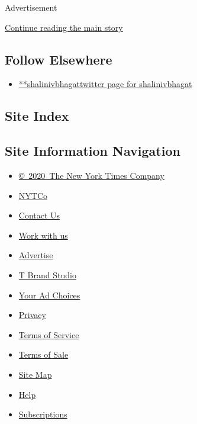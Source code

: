 Advertisement

\protect\hyperlink{after-mid2}{Continue reading the main story}

\hypertarget{follow-elsewhere}{%
\subsection{Follow Elsewhere}\label{follow-elsewhere}}

\begin{itemize}
\tightlist
\item
  \href{https://twitter.com/shalinivbhagat}{**shalinivbhagattwitter page
  for shalinivbhagat}
\end{itemize}

\hypertarget{site-index}{%
\subsection{Site Index}\label{site-index}}

\hypertarget{site-information-navigation}{%
\subsection{Site Information
Navigation}\label{site-information-navigation}}

\begin{itemize}
\tightlist
\item
  \href{https://help.nytimes.com/hc/en-us/articles/115014792127-Copyright-notice}{©~2020~The
  New York Times Company}
\end{itemize}

\begin{itemize}
\tightlist
\item
  \href{https://www.nytco.com/}{NYTCo}
\item
  \href{https://help.nytimes.com/hc/en-us/articles/115015385887-Contact-Us}{Contact
  Us}
\item
  \href{https://www.nytco.com/careers/}{Work with us}
\item
  \href{https://nytmediakit.com/}{Advertise}
\item
  \href{http://www.tbrandstudio.com/}{T Brand Studio}
\item
  \href{https://www.nytimes.com/privacy/cookie-policy\#how-do-i-manage-trackers}{Your
  Ad Choices}
\item
  \href{https://www.nytimes.com/privacy}{Privacy}
\item
  \href{https://help.nytimes.com/hc/en-us/articles/115014893428-Terms-of-service}{Terms
  of Service}
\item
  \href{https://help.nytimes.com/hc/en-us/articles/115014893968-Terms-of-sale}{Terms
  of Sale}
\item
  \href{https://spiderbites.nytimes.com}{Site Map}
\item
  \href{https://help.nytimes.com/hc/en-us}{Help}
\item
  \href{https://www.nytimes.com/subscription?campaignId=37WXW}{Subscriptions}
\end{itemize}
